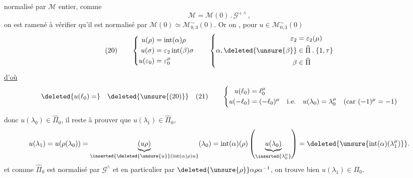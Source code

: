 

normalisé par $\mathcal M$  entier, comme
\[
\mathcal M=\mathcal M(0)\mathbin{.}\mathcal G^{+\wedge},
\]
on est ramené à vérifier qu'il est normalisé par
$\mathcal M(0)\simeq\mathcal M_{0,3}^{\sim}(0)$.
Or on , pour $u\in\mathcal M_{0,3}^{\sim}(0)$
\[
(20)\qquad
\left\{
\begin{aligned}
u(\rho)&=\operatorname{int}(\alpha)\rho\\
u(\sigma)&=\varepsilon_2\operatorname{int}(\beta)\sigma\\
u(\varepsilon_0)&=\varepsilon_0^\mu
\end{aligned}
\right.
\qquad
\left\{
\begin{aligned}
\varepsilon_2&=\varepsilon_2(\mu)\\
\alpha,\deleted{\unsure{\beta}}&\in\widehat{\Pi}\mathbin{.}\{1,\tau\}\\
\beta&\in\widehat{\Pi}
\end{aligned}
\right.
\]
\uline{d'où}
\[
\deleted{u(\ell_0)=}\quad
\deleted{\unsure{(20)}}\quad
(21)\qquad
\left\{
\begin{aligned}
u(\ell_0)&=\ell_0^\mu\\
u(-\ell_0)&=(-\ell_0)^\mu
\quad\text{i.e.}\quad
u(\lambda_0)=\lambda_0^\mu
\quad(\text{car }(-1)^\mu=-1)
\end{aligned}
\right.
\]
\margin{$\unsure{)}$}

donc $u(\lambda_0)\in\widehat{\Pi}_0$, il reste à prouver que
$u(\lambda_1)\in\widehat{\Pi}_0$, 
\[
u(\lambda_1)
=u(\rho(\lambda_0))
=\underbrace{(u\rho)}_{\inserted{\deleted{\unsure{u}}(\operatorname{int}(\alpha)\rho)u}}(\lambda_0)
=\operatorname{int}(\alpha)(\rho)
\left(\underbrace{u(\lambda_0)}_{\inserted{\lambda_0^\mu}}\right)
=\deleted{\unsure{\operatorname{int}(\alpha)(\lambda_1^\mu)}}.
\]
et comme $\widehat{\Pi}_0$ est normalisé par $\mathcal G^\wedge$
et en particulier par $\deleted{\unsure{\rho}}\alpha\rho\alpha^{-1}$,
on trouve bien $u(\lambda_1)\in\Pi_0$.

